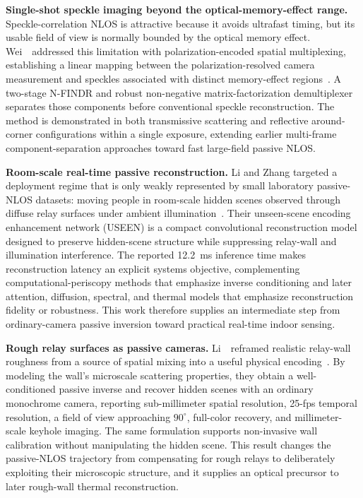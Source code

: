 \vspace{0.8mm}
\noindent \textbf{Single-shot speckle imaging beyond the optical-memory-effect range.}
Speckle-correlation NLOS is attractive because it avoids ultrafast timing, but its usable field of view is normally bounded by the optical memory effect. Wei~\etal~addressed this limitation with polarization-encoded spatial multiplexing, establishing a linear mapping between the polarization-resolved camera measurement and speckles associated with distinct memory-effect regions~\cite{weiPolarizationSpatialMultiplexing2026}. A two-stage N-FINDR and robust non-negative matrix-factorization demultiplexer separates those components before conventional speckle reconstruction. The method is demonstrated in both transmissive scattering and reflective around-corner configurations within a single exposure, extending earlier multi-frame component-separation approaches toward fast large-field passive NLOS.

\vspace{0.8mm}
\noindent \textbf{Room-scale real-time passive reconstruction.}
Li and Zhang targeted a deployment regime that is only weakly represented by small laboratory passive-NLOS datasets: moving people in room-scale hidden scenes observed through diffuse relay surfaces under ambient illumination~\cite{liUSEENPassiveNLOS2024}. Their unseen-scene encoding enhancement network (USEEN) is a compact convolutional reconstruction model designed to preserve hidden-scene structure while suppressing relay-wall and illumination interference. The reported 12.2~ms inference time makes reconstruction latency an explicit systems objective, complementing computational-periscopy methods that emphasize inverse conditioning and later attention, diffusion, spectral, and thermal models that emphasize reconstruction fidelity or robustness. This work therefore supplies an intermediate step from ordinary-camera passive inversion toward practical real-time indoor sensing.

\vspace{0.8mm}
\noindent \textbf{Rough relay surfaces as passive cameras.}
Li~\etal~reframed realistic relay-wall roughness from a source of spatial mixing into a useful physical encoding~\cite{liRoughSurfaceCameraNLOS2025}. By modeling the wall's microscale scattering properties, they obtain a well-conditioned passive inverse and recover hidden scenes with an ordinary monochrome camera, reporting sub-millimeter spatial resolution, 25-fps temporal resolution, a field of view approaching $90^{\circ}$, full-color recovery, and millimeter-scale keyhole imaging. The same formulation supports non-invasive wall calibration without manipulating the hidden scene. This result changes the passive-NLOS trajectory from compensating for rough relays to deliberately exploiting their microscopic structure, and it supplies an optical precursor to later rough-wall thermal reconstruction.

